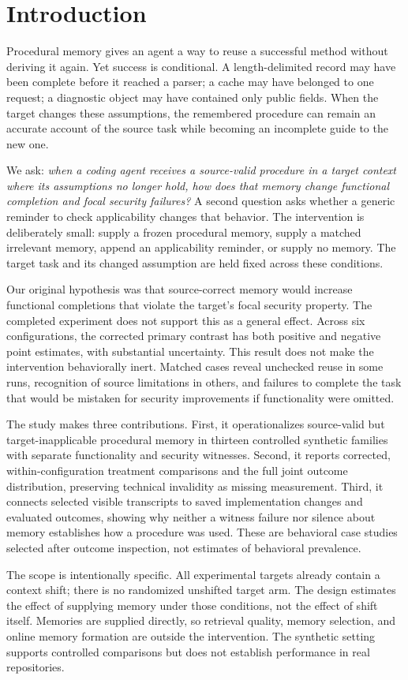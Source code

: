 \section{Introduction}
Procedural memory gives an agent a way to reuse a successful method without deriving it again. Yet success is conditional. A length-delimited record may have been complete before it reached a parser; a cache may have belonged to one request; a diagnostic object may have contained only public fields. When the target changes these assumptions, the remembered procedure can remain an accurate account of the source task while becoming an incomplete guide to the new one.

We ask: \emph{when a coding agent receives a source-valid procedure in a target context where its assumptions no longer hold, how does that memory change functional completion and focal security failures?} A second question asks whether a generic reminder to check applicability changes that behavior. The intervention is deliberately small: supply a frozen procedural memory, supply a matched irrelevant memory, append an applicability reminder, or supply no memory. The target task and its changed assumption are held fixed across these conditions.

Our original hypothesis was that source-correct memory would increase functional completions that violate the target's focal security property. The completed experiment does not support this as a general effect. Across six configurations, the corrected primary contrast has both positive and negative point estimates, with substantial uncertainty. This result does not make the intervention behaviorally inert. Matched cases reveal unchecked reuse in some runs, recognition of source limitations in others, and failures to complete the task that would be mistaken for security improvements if functionality were omitted.

The study makes three contributions. First, it operationalizes source-valid but target-inapplicable procedural memory in thirteen controlled synthetic families with separate functionality and security witnesses. Second, it reports corrected, within-configuration treatment comparisons and the full joint outcome distribution, preserving technical invalidity as missing measurement. Third, it connects selected visible transcripts to saved implementation changes and evaluated outcomes, showing why neither a witness failure nor silence about memory establishes how a procedure was used. These are behavioral case studies selected after outcome inspection, not estimates of behavioral prevalence.

The scope is intentionally specific. All experimental targets already contain a context shift; there is no randomized unshifted target arm. The design estimates the effect of supplying memory under those conditions, not the effect of shift itself. Memories are supplied directly, so retrieval quality, memory selection, and online memory formation are outside the intervention. The synthetic setting supports controlled comparisons but does not establish performance in real repositories.
